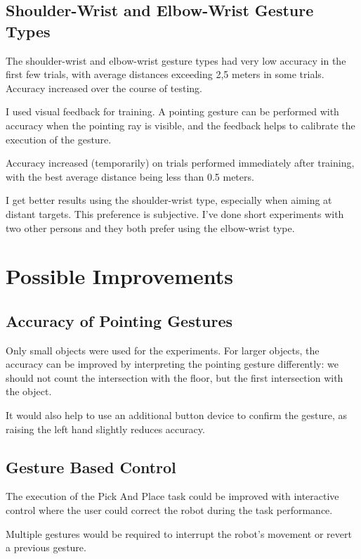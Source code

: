 \subsection{Shoulder-Wrist and Elbow-Wrist Gesture Types}
The shoulder-wrist and elbow-wrist gesture types had very low accuracy in the first few trials, with average distances exceeding 2,5 meters in some trials. Accuracy increased over the course of testing.\par
I used visual feedback for training. A pointing gesture can be performed with accuracy when the pointing ray is visible, and the feedback helps to calibrate the execution of the gesture.\par
Accuracy increased (temporarily) on trials performed immediately after training, with the best average distance being less than 0.5 meters.\par
I get better results using the shoulder-wrist type, especially when aiming at distant targets. This preference is subjective. I've done short experiments with two other persons and they both prefer using the elbow-wrist type.\par

\section{Possible Improvements}
\subsection{Accuracy of Pointing Gestures}
Only small objects were used for the experiments. For larger objects, the accuracy can be improved by interpreting the pointing gesture differently: we should not count the intersection with the floor, but the first intersection with the object.\par
It would also help to use an additional button device to confirm the gesture, as raising the left hand slightly reduces accuracy.\par

\subsection{Gesture Based Control}
The execution of the Pick And Place task could be improved with interactive control where the user could correct the robot during the task performance.\par 
Multiple gestures would be required to interrupt the robot's movement or revert a previous gesture.\par